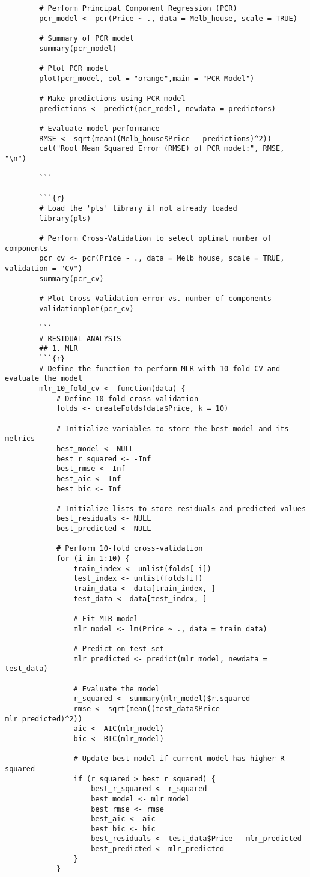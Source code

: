 \documentclass[12pt,doublespace]{article}
\begin{document}
\begin{lstlisting}
		# Perform Principal Component Regression (PCR)
		pcr_model <- pcr(Price ~ ., data = Melb_house, scale = TRUE)
		
		# Summary of PCR model
		summary(pcr_model)
		
		# Plot PCR model
		plot(pcr_model, col = "orange",main = "PCR Model")
		
		# Make predictions using PCR model
		predictions <- predict(pcr_model, newdata = predictors)
		
		# Evaluate model performance
		RMSE <- sqrt(mean((Melb_house$Price - predictions)^2))
		cat("Root Mean Squared Error (RMSE) of PCR model:", RMSE, "\n")
		
		```
		
		```{r}
		# Load the 'pls' library if not already loaded
		library(pls)
		
		# Perform Cross-Validation to select optimal number of components
		pcr_cv <- pcr(Price ~ ., data = Melb_house, scale = TRUE, validation = "CV")
		summary(pcr_cv)
		
		# Plot Cross-Validation error vs. number of components
		validationplot(pcr_cv)
		
		```
		# RESIDUAL ANALYSIS
		## 1. MLR
		```{r}
		# Define the function to perform MLR with 10-fold CV and evaluate the model
		mlr_10_fold_cv <- function(data) {
			# Define 10-fold cross-validation
			folds <- createFolds(data$Price, k = 10)
			
			# Initialize variables to store the best model and its metrics
			best_model <- NULL
			best_r_squared <- -Inf
			best_rmse <- Inf
			best_aic <- Inf
			best_bic <- Inf
			
			# Initialize lists to store residuals and predicted values
			best_residuals <- NULL
			best_predicted <- NULL
			
			# Perform 10-fold cross-validation
			for (i in 1:10) {
				train_index <- unlist(folds[-i])
				test_index <- unlist(folds[i])
				train_data <- data[train_index, ]
				test_data <- data[test_index, ]
				
				# Fit MLR model
				mlr_model <- lm(Price ~ ., data = train_data)
				
				# Predict on test set
				mlr_predicted <- predict(mlr_model, newdata = test_data)
				
				# Evaluate the model
				r_squared <- summary(mlr_model)$r.squared
				rmse <- sqrt(mean((test_data$Price - mlr_predicted)^2))
				aic <- AIC(mlr_model)
				bic <- BIC(mlr_model)
				
				# Update best model if current model has higher R-squared
				if (r_squared > best_r_squared) {
					best_r_squared <- r_squared
					best_model <- mlr_model
					best_rmse <- rmse
					best_aic <- aic
					best_bic <- bic
					best_residuals <- test_data$Price - mlr_predicted
					best_predicted <- mlr_predicted
				}
			}
			

\end{lstlisting}
\end{document}
